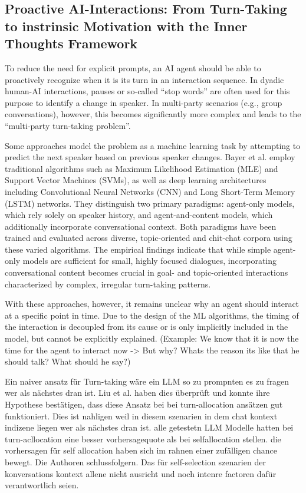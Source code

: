 \subsection{Proactive AI-Interactions: From Turn-Taking to instrinsic Motivation with the Inner Thoughts Framework}
\label{sec:proactive-ai-interactions}
To reduce the need for explicit prompts, an AI agent should be able to proactively recognize when it is its
turn in an interaction sequence. In dyadic human-AI interactions, pauses or so-called “stop words” are often
used for this purpose to identify a change in speaker. In multi-party scenarios (e.g., group conversations),
however, this becomes significantly more complex and leads to the “multi-party turn-taking
problem”. \cite{sacksSimplestSystematicsOrganization1974}

Some approaches model the problem as a machine learning task by attempting to predict the next speaker based
on previous speaker changes.
\cite{bayserLearningMultiPartyTurnTaking2019}
Bayer et al. employ traditional algorithms such as Maximum Likelihood Estimation (MLE) and Support Vector
Machines (SVMs), as well as deep learning architectures including Convolutional Neural Networks (CNN) and
Long Short-Term Memory (LSTM) networks. They distinguish two primary paradigms: agent-only
models, which rely solely on speaker history, and agent-and-content models, which additionally incorporate
conversational context. Both paradigms have been trained and evaluated across diverse, topic-oriented and
chit-chat corpora using these varied algorithms.
The empirical findings indicate that while simple agent-only models are sufficient for small, highly focused
dialogues, incorporating conversational content becomes crucial in goal- and topic-oriented interactions
characterized by complex, irregular turn-taking patterns.
\cite[p. 2]{bayserLearningMultiPartyTurnTaking2019}

With these approaches, however, it remains unclear why an agent should interact at a specific point in time.
Due to the design of the ML algorithms, the timing of the interaction is decoupled from its cause or is only
implicitly included in the model, but cannot be explicitly explained. (Example: We know that it is now the
time for the agent to interact now -> But why? Whats the reason its like that he should talk? What should he say?)

Ein naiver ansatz für Turn-taking wäre ein LLM so zu prompnten es zu fragen wer als nächstes dran ist. Liu
et al. \cite{liuProactiveConversationalAgents2025} haben dies überprüft und konnte ihre Hypothese bestätigen,
dass diese Ansatz bei bei turn-allocation ansätzen gut funktioniert. Dies ist nahligen weil in diesem
szenarien in dem chat kontext indizene liegen wer als nächstes dran ist. alle getestetn LLM Modelle hatten
bei turn-acllocation eine besser vorhersagequote als bei selfallocation stellen. die vorhersagen für self
allocation haben sich im rahnen einer zufälligen chance bewegt. Die Authoren schlussfolgern. Das für
self-selection szenarien der konversations kontext allene nicht ausricht und noch intenre factoren dafür
verantwortlich seien.

